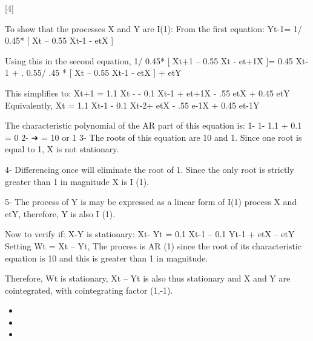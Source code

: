 \documentclass[a4paper,12pt]{article}
\begin{document}
[4]
\item  
To show that the processes X and Y are I(1):
From the first equation:
Yt-1= 1/ 0.45* [ Xt – 0.55 Xt-1 - etX ]

Using this in the second equation,
1/ 0.45* [ Xt+1 – 0.55 Xt - et+1X ]= 0.45 Xt-1 + . 0.55/ .45 * [ Xt – 0.55 Xt-1 - etX ] + etY

This simplifies to:
Xt+1 = 1.1 Xt - - 0.1 Xt-1 + et+1X - .55 etX + 0.45 etY
Equivalently,
Xt = 1.1 Xt-1 - 0.1 Xt-2+ etX - .55 e-1X + 0.45 et-1Y

The characteristic polynomial of the AR part of this equation is:
1- 1- 1.1 \lambda + 0.1  = 0
2- ➔ \lambda = 10 or 1
3- The roots of this equation are 10 and 1. Since one root is equal to 1, X is not stationary.

4- Differencing once will eliminate the root of 1. Since the only root is strictly greater than 1 in magnitude X is I (1).

5- The process of Y is may be expressed as a linear form of I(1) process X and etY, therefore, Y is also I (1).

Now to verify if: X-Y is stationary:
Xt- Yt = 0.1 Xt-1 – 0.1 Yt-1 + etX – etY
Setting Wt = Xt – Yt,
The process is AR (1) since the root of its characteristic equation is 10 and this is greater than 1 in magnitude.

Therefore, Wt is stationary, Xt – Yt is also thus stationary and X and Y are cointegrated, with cointegrating factor (1,-1).

\begin{itemize}
\item 
\item 
\item 
\end{itemize}
\end{document}
